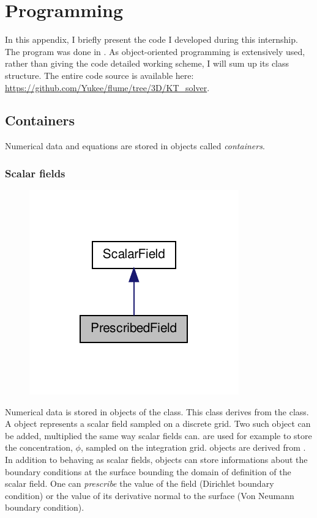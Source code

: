 
\chapter{Programming}
\label{app:prog}

In this appendix, I briefly present the code I developed during this internship.
The program was done in . As object-oriented programming is extensively used, rather than giving the code detailed working scheme, I will sum up its class structure. The entire code source is available here: \url{https://github.com/Yukee/flume/tree/3D/KT_solver}. 

\section {Containers}

Numerical data and equations are stored in objects called \textit{containers}.

\subsection{Scalar fields}

\begin{figure}[htp]
\centering
\includegraphics[scale=1.00]{appendix/class_prescribed_field__inherit__graph.pdf}
\caption{}
\label{}
\end{figure}

Numerical data is stored in objects of the  class. This class derives from the  class. 
A  object represents a scalar field sampled on a discrete grid.
Two such object can be added, multiplied the same way scalar fields can. 
 are used for example to store the concentration, $\phi$, sampled on the integration grid.
 objects are derived from . In addition to behaving as scalar fields,  objects can store informations about the boundary conditions at the surface bounding the domain of definition of the scalar field.
 One can \textit{prescribe} the value of the field (Dirichlet boundary condition) or the value of its derivative normal to the surface (Von Neumann boundary condition).
 
